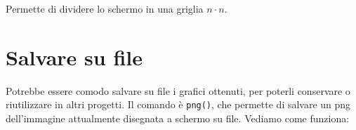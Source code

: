 

Permette di dividere lo schermo in una griglia $n \cdot n$.

\section{Salvare su file}

Potrebbe essere comodo salvare su file i grafici ottenuti, per poterli 
conservare o riutilizzare in altri progetti.
Il comando è \texttt{png()}, che permette di salvare un png dell'immagine 
attualmente disegnata a schermo su file.
Vediamo come funziona:




